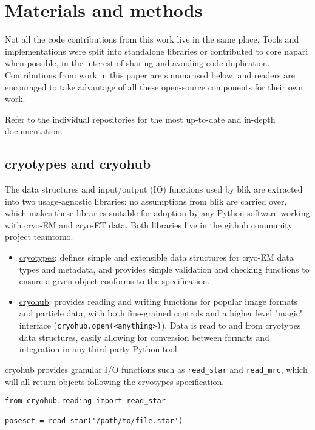 \section{Materials and methods}
Not all the code contributions from this work live in the same place. Tools and implementations were split into standalone libraries or contributed to core napari when possible, in the interest of sharing and avoiding code duplication. Contributions from work in this paper are summarised below, and readers are encouraged to take advantage of all these open-source components for their own work.

Refer to the individual repositories for the most up-to-date and in-depth documentation.

\subsection{cryotypes and cryohub}\label{cryotypes-and-cryohub}

The data structures and input/output (IO) functions used by blik are extracted into two usage-agnostic libraries: no assumptions from blik are carried over, which makes these libraries suitable for adoption by any Python software working with cryo-EM and cryo-ET data. Both libraries live in the github community project \href{https://github.com/teamtomo/}{teamtomo}.

\begin{itemize}[noitemsep] 
    \item \href{https://github.com/teamtomo/cryotypes/}{cryotypes}: defines simple and extensible data structures for cryo-EM data types and metadata, and provides simple validation and checking functions to ensure a given object conforms to the specification. 
    \item \href{https://github.com/teamtomo/cryohub/}{cryohub}: provides reading and writing functions for popular image formats and particle data, with both fine-grained controls and a higher level "magic" interface (\texttt{cryohub.open(\textless{}anything\textgreater{})}). Data is read to and from cryotypes data structures, easily allowing for conversion between formats and integration in any third-party Python tool.
\end{itemize}

cryohub provides granular I/O functions such as \texttt{read\_star} and \texttt{read\_mrc}, which will all return objects following the cryotypes specification.

\begin{verbatim}
from cryohub.reading import read_star

poseset = read_star('/path/to/file.star')
\end{verbatim}

